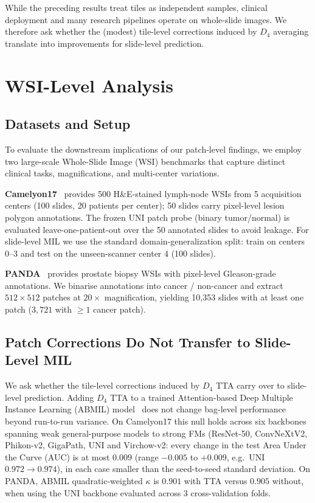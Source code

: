 \documentclass{melba}
\begin{document}
While the preceding results treat tiles as independent samples, clinical deployment and many research pipelines operate on whole-slide images. We therefore ask whether the (modest) tile-level corrections induced by $D_4$ averaging translate into improvements for slide-level prediction.


\section{WSI-Level Analysis}
\label{sec:wsi}

\subsection{Datasets and Setup}

To evaluate the downstream implications of our patch-level findings, we employ two large-scale Whole-Slide Image (WSI) benchmarks that capture distinct clinical tasks, magnifications, and multi-center variations.

\textbf{Camelyon17}~\citep{bandi2018camelyon17} provides 500 H\&E-stained lymph-node WSIs from 5 acquisition centers (100 slides, 20 patients per center); 50 slides carry pixel-level lesion polygon annotations.
The frozen UNI patch probe (binary tumor/normal) is evaluated leave-one-patient-out over the 50 annotated slides to avoid leakage. For slide-level MIL we use the standard domain-generalization split: train on centers 0--3 and test on the unseen-scanner center 4 (100 slides).

\textbf{PANDA}~\citep{bulten2022artificial} provides prostate biopsy WSIs with pixel-level Gleason-grade annotations.
We binarise annotations into cancer / non-cancer and extract $512\times512$ patches at $20\times$ magnification, yielding 10,353 slides with at least one patch ($3{,}721$ with $\geq1$ cancer patch).


\subsection{Patch Corrections Do Not Transfer to Slide-Level MIL}

We ask whether the tile-level corrections induced by $D_4$ TTA carry over to slide-level prediction. Adding $D_4$ TTA to a trained Attention-based Deep Multiple Instance Learning (ABMIL) model~\citep{ilse2018abmil} does not change bag-level performance beyond run-to-run variance. On Camelyon17 this null holds across six backbones spanning weak general-purpose models to strong FMs (ResNet-50, ConvNeXtV2, Phikon-v2, GigaPath, UNI and Virchow-v2: every change in the test Area Under the Curve (AUC) is at most $0.009$ (range $-0.005$ to $+0.009$, e.g.\ UNI $0.972 \to 0.974$), in each case smaller than the seed-to-seed standard deviation. On PANDA, ABMIL quadratic-weighted $\kappa$ is $0.901$ with TTA versus $0.905$ without, when using the UNI backbone evaluated across 3 cross-validation folds.
\end{document}
